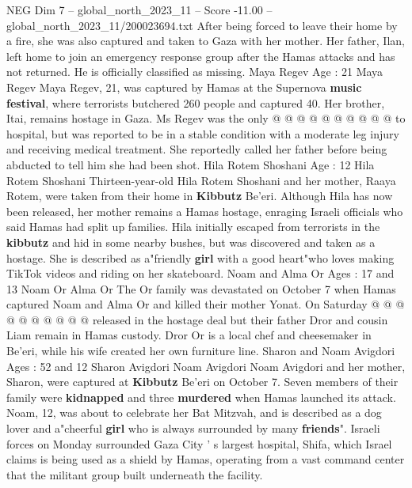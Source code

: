 \begin{textsample}{NEG Dim 7 – global\_north\_2023\_11 – Score -11.00 – global\_north\_2023\_11/200023694.txt}
After being forced to leave their home by a fire, she was also captured and taken to Gaza with her mother.
Her father, Ilan, left home to join an emergency response group after the Hamas attacks and has not returned.
He is officially classified as missing.
Maya Regev Age : 21 Maya Regev Maya Regev, 21, was captured by Hamas at the Supernova \textbf{music} \textbf{festival}, where terrorists butchered 260 people and captured 40.
Her brother, Itai, remains hostage in Gaza.
Ms Regev was the only @ @ @ @ @ @ @ @ @ @ to hospital, but was reported to be in a stable condition with a moderate leg injury and receiving medical treatment.
She reportedly called her father before being abducted to tell him she had been shot.
Hila Rotem Shoshani Age : 12 Hila Rotem Shoshani Thirteen-year-old Hila Rotem Shoshani and her mother, Raaya Rotem, were taken from their home in \textbf{Kibbutz} Be'eri.
Although Hila has now been released, her mother remains a Hamas hostage, enraging Israeli officials who said Hamas had split up families.
Hila initially escaped from terrorists in the \textbf{kibbutz} and hid in some nearby bushes, but was discovered and taken as a hostage.
She is described as a"friendly \textbf{girl} with a good heart"who loves making TikTok videos and riding on her skateboard.
Noam and Alma Or Ages : 17 and 13 Noam Or Alma Or The Or family was devastated on October 7 when Hamas captured Noam and Alma Or and killed their mother Yonat.
On Saturday @ @ @ @ @ @ @ @ @ @ released in the hostage deal but their father Dror and cousin Liam remain in Hamas custody.
Dror Or is a local chef and cheesemaker in Be'eri, while his wife created her own furniture line.
Sharon and Noam Avigdori Ages : 52 and 12 Sharon Avigdori Noam Avigdori Noam Avigdori and her mother, Sharon, were captured at \textbf{Kibbutz} Be'eri on October 7.
Seven members of their family were \textbf{kidnapped} and three \textbf{murdered} when Hamas launched its attack.
Noam, 12, was about to celebrate her Bat Mitzvah, and is described as a dog lover and a"cheerful \textbf{girl} who is always surrounded by many \textbf{friends}".
Israeli forces on Monday surrounded Gaza City ' s largest hospital, Shifa, which Israel claims is being used as a shield by Hamas, operating from a vast command center that the militant group built underneath the facility.

\end{textsample}
